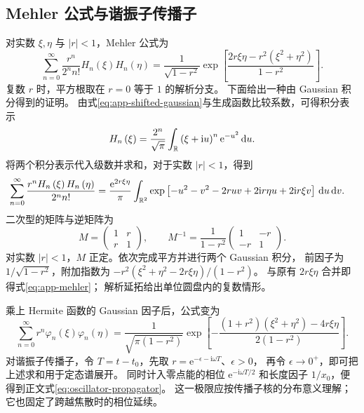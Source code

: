 \subsection{Mehler 公式与谐振子传播子}
对实数 $\xi,\eta$ 与 $\left|r\right|<1$，Mehler 公式为
\begin{equation}
\boxed{\sum_{n=0}^{\infty}\frac{r^n}{2^n n!}
H_n\left(\xi\right)H_n\left(\eta\right)
=\frac{1}{\sqrt{1-r^2}}
\exp\left[\frac{2r\xi\eta-r^2\left(\xi^2+\eta^2\right)}{1-r^2}\right].}
\label{eq:app-mehler}
\end{equation}
复数 $r$ 时，平方根取在 $r=0$ 等于 $1$ 的解析分支。
下面给出一种由 Gaussian 积分得到的证明。
由式\eqref{eq:app-shifted-gaussian}与生成函数比较系数，可得积分表示
\begin{equation}
H_n\left(\xi\right)
=\frac{2^n}{\sqrt\pi}\int_{\mathbb{R}}
\left(\xi+\mathrm{i}u\right)^n\mathrm{e}^{-u^2}\,\mathrm{d}u.
\end{equation}
将两个积分表示代入级数并求和，对于实数 $\left|r\right|<1$，得到
\begin{align}
\sum_{n=0}^{\infty}\frac{r^nH_n\left(\xi\right)H_n\left(\eta\right)}{2^n n!}
&=\frac{\mathrm{e}^{2r\xi\eta}}{\pi}
\int_{\mathbb{R}^2}\exp\left[-u^2-v^2-2ruv
+2\mathrm{i}r\eta u+2\mathrm{i}r\xi v\right]\,\mathrm{d}u\,\mathrm{d}v.
\end{align}
二次型的矩阵与逆矩阵为
\begin{equation}
M=\left(\begin{matrix}1&r\\r&1\end{matrix}\right),
\qquad
M^{-1}=\frac{1}{1-r^2}
\left(\begin{matrix}1&-r\\-r&1\end{matrix}\right).
\end{equation}
对实数 $\left|r\right|<1$，$M$ 正定。依次完成平方并进行两个 Gaussian 积分，
前因子为 $1/\sqrt{1-r^2}$，附加指数为
$-r^2\left(\xi^2+\eta^2-2r\xi\eta\right)/\left(1-r^2\right)$。
与原有 $2r\xi\eta$ 合并即得式\eqref{eq:app-mehler}；
解析延拓给出单位圆盘内的复数情形。

乘上 Hermite 函数的 Gaussian 因子后，公式变为
\begin{equation}
\sum_{n=0}^{\infty}r^n\varphi_n\left(\xi\right)\varphi_n\left(\eta\right)
=\frac{1}{\sqrt{\pi\left(1-r^2\right)}}
\exp\left[-\frac{\left(1+r^2\right)\left(\xi^2+\eta^2\right)-4r\xi\eta}
{2\left(1-r^2\right)}\right].
\end{equation}
对谐振子传播子，令 $T=t-t_0$，先取
$r=\mathrm{e}^{-\epsilon-\mathrm{i}\omega T}$、$\epsilon>0$，
再令 $\epsilon\to0^+$，即可把上述求和用于定态谱展开。
同时计入零点能的相位 $\mathrm{e}^{-\mathrm{i}\omega T/2}$ 和长度因子
$1/x_0$，便得到正文式\eqref{eq:oscillator-propagator}。
这一极限应按传播子核的分布意义理解；它也固定了跨越焦散时的相位延续。
